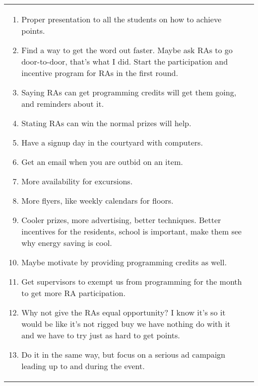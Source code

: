 \documentclass[]{article}
\begin{document}
\begin{figure*}[th!]
\begin{tabular}{|l|l|}
\begin{minipage}[t]{3.75in}
\begin{enumerate}
\item Proper presentation to all the students on how to achieve points. 
\item Find a way to get the word out faster.  Maybe ask RAs to go door-to-door, that's what I did.   Start the 
participation and incentive program for RAs in the first round.
\item Saying RAs can get programming credits will get them going, and reminders about it. 
\item Stating RAs can win the normal prizes will help.
\item Have a signup day in the courtyard with computers.
\item Get an email when you are outbid on an item. 
\item More availability for excursions.
\item More flyers, like weekly calendars for floors. 
\item Cooler prizes, more advertising, better techniques.  Better incentives for the residents, school is important, make them see why energy saving is cool.
\item Maybe motivate by providing programming credits as well. 
\item Get supervisors to exempt us from programming for the month to get more RA participation.
\item Why not give the RAs equal opportunity?  I know it's so it would be like it's not rigged buy we have nothing do with it and we have to try just as hard to get points.
\item Do it in the same way, but focus on a serious ad campaign leading up to and during the event.
\end{enumerate}
\end{minipage}  \normalsize

&


\end{tabular}
\end{figure*}
\end{document}
